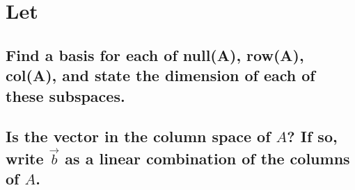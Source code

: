 \documentclass[../main.tex]{subfiles}
\begin{document}
\section[]{Let }

\subsection[]{Find a basis for each of null(A), row(A), col(A), and state the dimension of each of these subspaces.}
\subsection[]{Is the vector  in the column space of $A$? If so, write $\vec{b}$ as a linear combination of the columns of $A$.}
\end{document}
